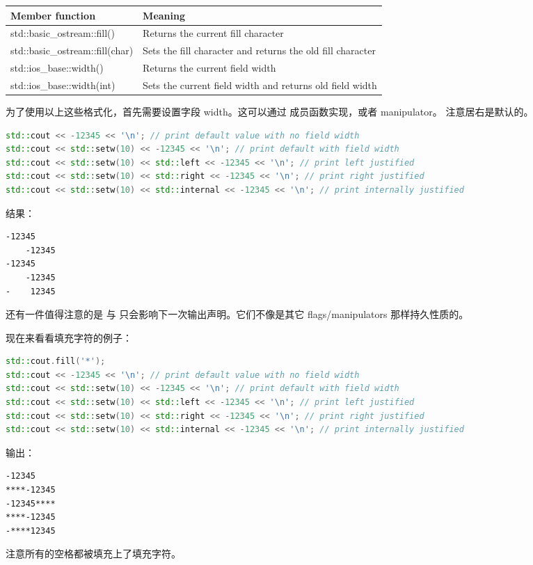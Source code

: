 \documentclass[../../LearnCpp.tex]{subfiles}
\begin{document}
\begin{center}
  \begin{tiny}
    \begin{tabularx}{ 1\textwidth}{
        | >{\raggedright\arraybackslash}X
        | >{\raggedright\arraybackslash}X |
      }
      \hline
      Member function                 & Meaning                                                    \\
      \hline
      std::basic\_ostream::fill()     & Returns the current fill character                         \\
      std::basic\_ostream::fill(char) & Sets the fill character and returns the old fill character \\
      std::ios\_base::width()         & Returns the current field width                            \\
      std::ios\_base::width(int)      & Sets the current field width and returns old field width   \\
      \hline
    \end{tabularx}
  \end{tiny}
\end{center}

为了使用以上这些格式化，首先需要设置字段 width。这可以通过  成员函数实现，或者  manipulator。
注意居右是默认的。

\begin{lstlisting}[language=C++]
std::cout << -12345 << '\n'; // print default value with no field width
std::cout << std::setw(10) << -12345 << '\n'; // print default with field width
std::cout << std::setw(10) << std::left << -12345 << '\n'; // print left justified
std::cout << std::setw(10) << std::right << -12345 << '\n'; // print right justified
std::cout << std::setw(10) << std::internal << -12345 << '\n'; // print internally justified
\end{lstlisting}

结果：

\begin{lstlisting}
-12345
    -12345
-12345
    -12345
-    12345
\end{lstlisting}

还有一件值得注意的是  与  只会影响下一次输出声明。它们不像是其它 flags/manipulators 那样持久性质的。

现在来看看填充字符的例子：

\begin{lstlisting}[language=C++]
std::cout.fill('*');
std::cout << -12345 << '\n'; // print default value with no field width
std::cout << std::setw(10) << -12345 << '\n'; // print default with field width
std::cout << std::setw(10) << std::left << -12345 << '\n'; // print left justified
std::cout << std::setw(10) << std::right << -12345 << '\n'; // print right justified
std::cout << std::setw(10) << std::internal << -12345 << '\n'; // print internally justified
\end{lstlisting}

输出：

\begin{lstlisting}
-12345
****-12345
-12345****
****-12345
-****12345
\end{lstlisting}

注意所有的空格都被填充上了填充字符。
\end{document}

